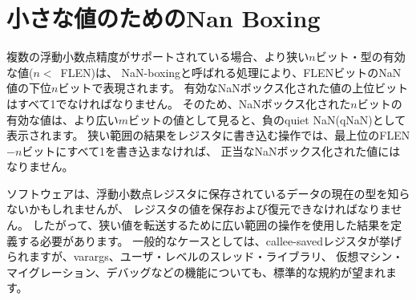 \begin{comment}
\section{NaN Boxing of Narrower Values}
\end{comment}
\section{小さな値のためのNan Boxing}
\label{nanboxing}

\begin{comment}
When multiple floating-point precisions are supported, then valid
values of narrower $n$-bit types, \mbox{$n<$ FLEN}, are represented in
the lower $n$ bits of an FLEN-bit NaN value, in a process termed
NaN-boxing.  The upper bits of a valid NaN-boxed value must be all 1s.
Valid NaN-boxed $n$-bit values therefore appear as negative quiet NaNs
(qNaNs) when viewed as any wider $m$-bit value, \mbox{$n < m \leq$
  FLEN}.  Any operation that writes a narrower result to an {\tt f}
register must write all 1s to the uppermost FLEN$-n$ bits to yield a
legal NaN-boxed value.
\end{comment}

複数の浮動小数点精度がサポートされている場合、より狭い$n$ビット・型の有効な値(\mbox{$n<$ FLEN})は、
NaN-boxingと呼ばれる処理により、FLENビットのNaN値の下位$n$ビットで表現されます。 
有効なNaNボックス化された値の上位ビットはすべて1でなければなりません。
そのため、NaNボックス化された$n$ビットの有効な値は、より広い$m$ビットの値として見ると、負のquiet NaN(qNaN)として表示されます。 
狭い範囲の結果をレジスタに書き込む操作では、最上位のFLEN$-n$ビットにすべて1を書き込まなければ、
正当なNaNボックス化された値にはなりません。

\begin{commentary}
\begin{comment}
Software might not know the current type of data stored in a
floating-point register but has to be able to save and restore the
register values, hence the result of using wider operations to
transfer narrower values has to be defined.  A common case is for
callee-saved registers, but a standard convention is also desirable for
features including varargs, user-level threading libraries, virtual
machine migration, and debugging.
\end{comment}
ソフトウェアは、浮動小数点レジスタに保存されているデータの現在の型を知らないかもしれませんが、
レジスタの値を保存および復元できなければなりません。
したがって、狭い値を転送するために広い範囲の操作を使用した結果を定義する必要があります。 
一般的なケースとしては、callee-savedレジスタが挙げられますが、varargs、ユーザ・レベルのスレッド・ライブラリ、
仮想マシン・マイグレーション、デバッグなどの機能についても、標準的な規約が望まれます。
\end{commentary}

